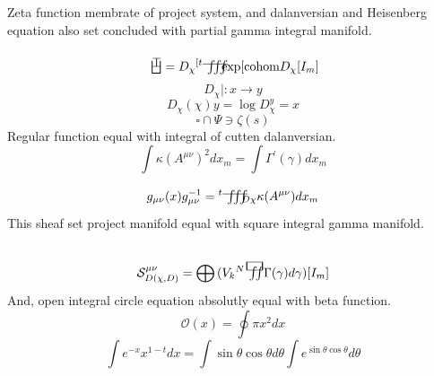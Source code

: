 \documentclass{jsarticle}
\begin{document}
 \newcommand{\whitewithbodercirclevarint}{%
	 \begin{picture}(13,13)
		 \put(0,0){\scalebox{2.0}[2]{$\whitewithbodercircle$}}
		 \put(0,0){\scalebox{2.0}[2]{$\varint$}}
	 \end{picture}%
	 }
 
 \newcommand{\whitewithbodercirclevariiint}{%
	 \begin{picture}(13,13)
		 \put(0,0){\scalebox{2.0}[2]{$\whitewithbodercircle$}}
		 \put(0,0){\scalebox{2.0}[2]{$\variiint$}}
	 \end{picture}%
	 }
 
 \newcommand{\average}{%
	  \begin{picture}(30,45)
		  \put(0,0){\scalebox{2.0}[2]{$\square$}}
		  \put(4,4){$\setminus$}
	  \end{picture}%
  } 
  \newcommand{\smallaverage}{%
	  \begin{picture}(30,45)
		  \put(0,0){\scalebox{1.0}[1]{$\square$}}
		  \put(0,0){$\setminus$}
	  \end{picture}%
  } 
 
  \newcommand{\whitewithboder}{%
	  \begin{picture}(15,30)
		  \put(0,0){\scalebox{2.0}[2]{$\square$}}
		  \put(4,4){$\square$}
	  \end{picture}%
  } 
  \newcommand{\whitewithnabla}{%
	  \begin{picture}(15,30)
		  \put(0,0){\scalebox{2.0}[2]{$\nabla$}}
		  \put(3,3){$\nabla$}
	  \end{picture}%
  } 



Zeta function membrate of project system, and dalanversian and Heisenberg
equation also set concluded with partial gamma integral manifold.

$$ \dazanier = D_{\chi}{}^{[t}\variiint \mathrm{exp}[\mathrm{cohom}
D_{\chi}[I_m] $$ 
$$ D_{\chi} |: x \to y $$
$$ D_{\chi}(\chi)y = \log D_{\chi}^{y} = x $$
$$ \square \cap \Psi \ni  \zeta(s) $$
Regular function equal with integral of cutten dalanversian.
$$ \int \kappa (A^{\mu\nu})^{2}dx_m = \int \Gamma^{'}(\gamma)dx_m $$
$$ g_{\mu\nu}(x)g^{-1}_{\mu\nu} = {}^{t}\variiint_{D\chi}\kappa
(A^{\mu\nu})dx_m $$
This sheaf set project manifold equal with square integral gamma manifold.
$$  \mathcal{S}^{\mu\nu}_{D(\chi,D)} = \bigoplus {(V_{k}{}^{N}\squareiint
\Gamma(\gamma)d\gamma)}[I_m] $$
And, open integral circle equation absolutly equal with beta function.
$$ \mathcal{O}(x) = \oint \pi x^2 dx $$
$$ \int e^{-x}x^{1-t}dx = \int \sin \theta \cos \theta d \theta \int e^{\sin \theta \cos \theta}d\theta $$
\end{document}
